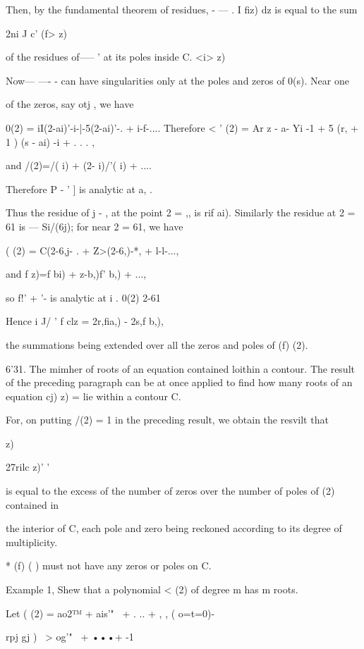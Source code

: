 Then, by the fundamental theorem of residues, - — . I fiz) dz is equal
to the sum

 2ni J c' (f> z)

of the residues of--— ' at its poles inside C. <i> z)

Now— —- - can have singularities only at the poles and zeros of 0(s).
Near one

of the zeros, say otj , we have

0(2) = iI(2-ai)'-i-|-5(2-ai)'-. + i-f-.... Therefore < ' (2) = Ar z -
a- Yi -1 + 5 (r, + 1 ) (s - ai) -i + . . . ,

and /(2)=/( i) + (2- i)/'( i) + ....

Therefore P - ' ] is analytic at a, .

Thus the residue of j - , at the point 2 = ,, is rif ai). Similarly
the residue at 2 = 61 is — Si/(6j); for near 2 = 61, we have

( (2) = C(2-6,j- . + Z>(2-6,)-*, + l-l-...,

and f z)=f bi) + z-b,)f' b,) + ...,

so f!' + '- is analytic at i . 0(2) 2-61

Hence i J/ ' f clz = 2r,fia,) - 2s,f b,),

the summations being extended over all the zeros and poles of (f) (2).

6'31. The mimher of roots of an equation contained loithin a contour.
The result of the preceding paragraph can be at once applied to find
how many roots of an equation cj) z) = lie within a contour C.

For, on putting /(2) = 1 in the preceding result, we obtain the
resvilt that



z)



27rilc z)' '

is equal to the excess of the number of zeros over the number of poles
of (2) contained in

the interior of C, each pole and zero being reckoned according to its
degree of multiplicity.

* (f) ( ) must not have any zeros or poles on C.


%
%

Example 1, Shew that a polynomial < (2) of degree m has m roots.

Let ( (2) = ao2™ + ais'"~ + . .. + , , ( o=t=0)-

rpj gj ) \ > og'"~ + •••+ -1

